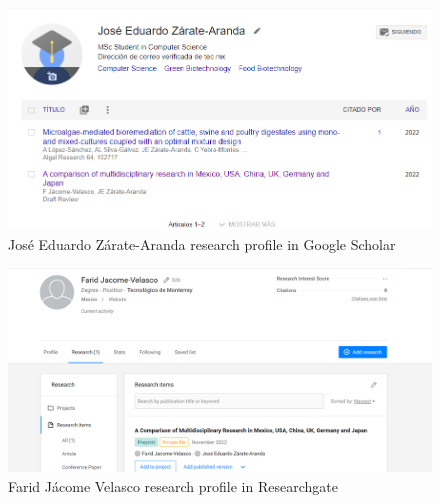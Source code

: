 \documentclass[conference]{IEEEtran}
\begin{document}
\begin{figure}[H]
    \centering
    \includegraphics[width = 8 cm]{JEDZA2.png}
    \caption{José Eduardo Zárate-Aranda research profile in Google Scholar}
    \label{fig:JEDZA2}
\end{figure}

\begin{figure}[H]
    \centering
    \includegraphics[width = 8 cm]{Farid1.png}
    \caption{Farid Jácome Velasco research profile in Researchgate}
    \label{fig:Farid1}
\end{figure}



\end{document}
